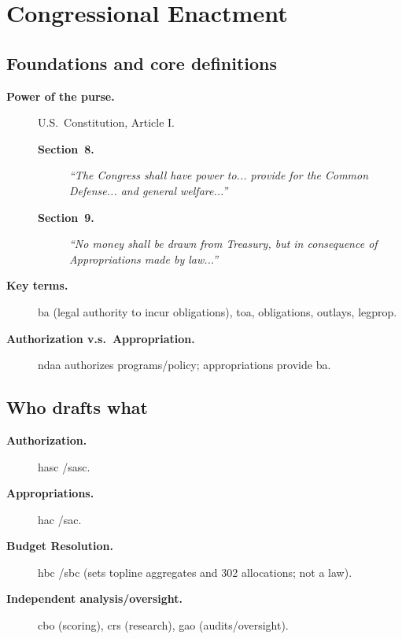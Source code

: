 \documentclass[../main.tex]{subfiles}
\begin{document}
\section{Congressional Enactment}
\minibib
\subsection{Foundations and core definitions}
\begin{description}
	\item[\textbf{Power of the purse.}] U.S.\ Constitution, Article I.
	      \begin{description}
		      \item[\textbf{Section~8.}] \textit{\quote ``The Congress shall have power to... provide for the Common Defense... and general welfare...''}
		      \item[\textbf{Section~9.}] \textit{\quote ``No money shall be drawn from Treasury, but in consequence of Appropriations made by law...''}
	      \end{description}
	\item[\textbf{Key terms.}] \ac{ba} (legal authority to incur obligations), \ac{toa}, obligations, outlays, \ac{legprop}.
	\item[\textbf{Authorization v.s.\ Appropriation.}] \ac{ndaa} authorizes programs/policy; appropriations provide \ac{ba}.
\end{description}

\subsection{Who drafts what}
\begin{description}
	\item[\textbf{Authorization.}] \ac{hasc} /\ac{sasc}.
	\item[\textbf{Appropriations.}] \ac{hac} /\ac{sac}.
	\item[\textbf{Budget Resolution.}] \ac{hbc} /\ac{sbc} (sets topline aggregates and 302 allocations; not a law).
	\item[\textbf{Independent analysis/oversight.}] \ac{cbo} (scoring), \ac{crs} (research), \ac{gao} (audits/oversight).
\end{description}
\end{document}
